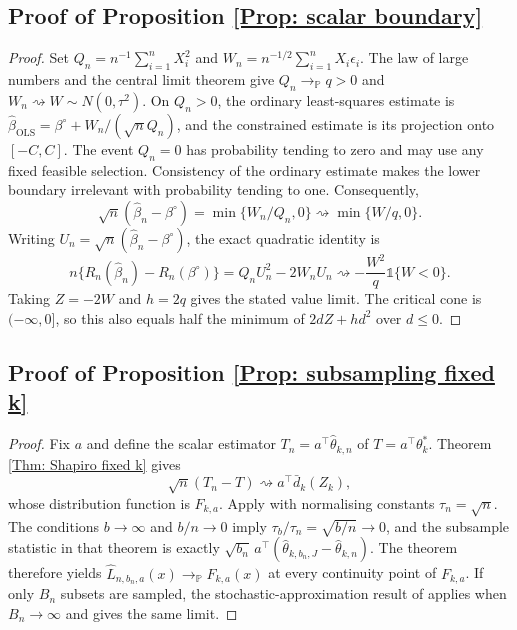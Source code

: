 \documentclass[12pt]{article}
\newenvironment{bluechange}{\begingroup\color[rgb]{0.00,0.00,1.00}}{\endgroup}
\theoremstyle{remark}
\theoremstyle{plain}
\begin{document}
\begin{bluechange}
\subsection{Proof of Proposition \ref{Prop: scalar boundary}}
\begin{proof}
Set $Q_n=n^{-1}\sum_{i=1}^nX_i^2$ and $W_n=n^{-1/2}\sum_{i=1}^nX_i\epsilon_i$. The law of large numbers and the central limit theorem give $Q_n\to_{\mathbb P}q>0$ and $W_n\rightsquigarrow W\sim N(0,\tau^2)$. On $Q_n>0$, the ordinary least-squares estimate is $\widehat\beta_{\mathrm{OLS}}=\beta^\circ+W_n/(\sqrt n Q_n)$, and the constrained estimate is its projection onto $[-C,C]$. The event $Q_n=0$ has probability tending to zero and may use any fixed feasible selection. Consistency of the ordinary estimate makes the lower boundary irrelevant with probability tending to one. Consequently,
\[
\sqrt n(\widehat\beta_n-\beta^\circ)
=\min\{W_n/Q_n,0\}\rightsquigarrow\min\{W/q,0\}.
\]
Writing $U_n=\sqrt n(\widehat\beta_n-\beta^\circ)$, the exact quadratic identity is
\[
n\{R_n(\widehat\beta_n)-R_n(\beta^\circ)\}
=Q_nU_n^2-2W_nU_n
\rightsquigarrow-\frac{W^2}{q}\mathds 1\{W<0\}.
\]
Taking $Z=-2W$ and $h=2q$ gives the stated value limit. The critical cone is $(-\infty,0]$, so this also equals half the minimum of $2dZ+hd^2$ over $d\le0$.
\end{proof}

\subsection{Proof of Proposition \ref{Prop: subsampling fixed k}}
\begin{proof}
Fix $a$ and define the scalar estimator $T_n=a^\top\widehat\theta_{k,n}$ of $T=a^\top\theta_k^*$. Theorem \ref{Thm: Shapiro fixed k} gives
\[
\sqrt n(T_n-T)\rightsquigarrow a^\top\bar d_k(Z_k),
\]
whose distribution function is $F_{k,a}$. Apply \citet[Theorem 2.2.1]{politis1999subsampling} with normalising constants $\tau_n=\sqrt n$. The conditions $b\to\infty$ and $b/n\to0$ imply $\tau_b/\tau_n=\sqrt{b/n}\to0$, and the subsample statistic in that theorem is exactly $\sqrt{b_n}\,a^\top(\widehat\theta_{k,b_n,J}-\widehat\theta_{k,n})$. The theorem therefore yields $\widehat L_{n,b_n,a}(x)\to_{\mathbb P}F_{k,a}(x)$ at every continuity point of $F_{k,a}$. If only $B_n$ subsets are sampled, the stochastic-approximation result of \citet[Corollary 2.4.1]{politis1999subsampling} applies when $B_n\to\infty$ and gives the same limit.
\end{proof}
\end{bluechange}
\end{document}

